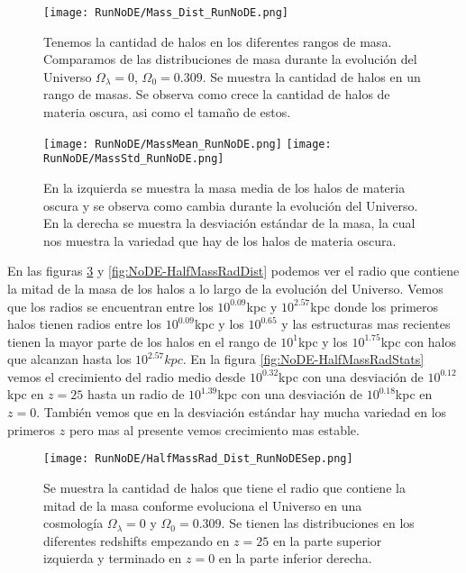 \begin{figure}[H]
    \centering
    \texttt{[image: RunNoDE/Mass\_Dist\_RunNoDE.png]}
    \caption[Comparación de distribución de masa en un Universo $\Omega_\lambda = 0$, $\Omega_0 = 0.309$]{\footnotesize Tenemos la cantidad de halos en los diferentes rangos de masa. Comparamos de las distribuciones de masa durante la evolución del Universo $\Omega_\lambda = 0$, $\Omega_0 = 0.309$. Se muestra la cantidad de halos en un rango de masas. Se observa como crece la cantidad de halos de materia oscura, asi como el tamaño de estos.}
    \label{fig:NoDE-MassDist}
\end{figure}

\begin{figure}[H]
    \centering
    \texttt{[image: RunNoDE/MassMean\_RunNoDE.png]}
    \texttt{[image: RunNoDE/MassStd\_RunNoDE.png]}
    \caption[Media y desviación estándar de la distribución de masa de un Universo $\Omega_\lambda = 0$, $\Omega_0 = 0.309$]{\footnotesize En la izquierda se muestra la masa media de los halos de materia oscura y se observa como cambia durante la evolución del Universo. En la derecha se muestra la desviación estándar de la masa, la cual nos muestra la variedad que hay de los halos de materia oscura.}
    \label{fig:NoDE-MassStats}
\end{figure}

En las figuras \ref{fig:NoDE-HalfMassRadDistSep} y \ref{fig:NoDE-HalfMassRadDist} podemos ver el radio que contiene la mitad de la masa de los halos a lo largo de la evolución del Universo. Vemos que los radios se encuentran entre los $10^{0.09}$kpc y $10^{2.57}$kpc donde los primeros halos tienen radios entre los $10^{0.09}$kpc y los $10^{0.65}$ y las estructuras mas recientes tienen la mayor parte de los halos en el rango de $10^{1}$kpc y los $10^{1.75}$kpc con halos que alcanzan hasta los $10^{2.57}kpc$. En la figura \ref{fig:NoDE-HalfMassRadStats} vemos el crecimiento del radio medio desde $10^{0.32}$kpc con una desviación de $10^{0.12}$kpc en $z=25$ hasta un radio de $10^{1.39}$kpc con una desviación de $10^{0.18}$kpc en $z=0$. También vemos que en la desviación estándar hay mucha variedad en los primeros $z$ pero mas al presente vemos crecimiento mas estable.

\begin{figure}[H]
    \centering
    \texttt{[image: RunNoDE/HalfMassRad\_Dist\_RunNoDESep.png]}
    \caption[Radio que contiene la mitad de la masa en la evolución de un Universo $\Omega_\lambda = 0$, $\Omega_0 = 0.309$]{\footnotesize Se muestra la cantidad de halos que tiene el radio que contiene la mitad de la masa conforme evoluciona el Universo en una cosmología $\Omega_\lambda = 0$ y $\Omega_0 = 0.309$. Se tienen las distribuciones en los diferentes redshifts empezando en $z=25$ en la parte superior izquierda y terminado en $z=0$ en la parte inferior derecha.}
    \label{fig:NoDE-HalfMassRadDistSep}
\end{figure}

